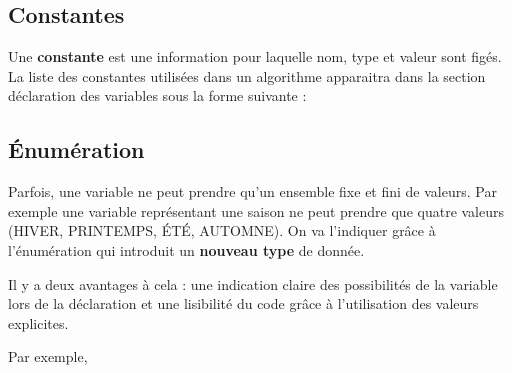 		\subsection{Constantes}

			Une \textbf{constante} est une information pour laquelle nom, type et
			valeur sont figés. La liste des constantes utilisées dans un algorithme
			apparaitra dans la section déclaration des variables sous la forme
			suivante :



		\subsection{Énumération}

			Parfois, une variable ne peut prendre qu'un ensemble
			fixe et fini de valeurs. Par exemple une variable représentant une
			saison ne peut prendre que quatre valeurs (HIVER, PRINTEMPS, ÉTÉ,
			AUTOMNE). On va l'indiquer grâce à
			l'énumération qui introduit un \textbf{nouveau type}
			de donnée.


			Il y a deux avantages à cela : une indication claire des possibilités de
			la variable lors de la déclaration et une lisibilité du code grâce à
			l'utilisation des valeurs explicites.
			
			Par exemple, 
			


